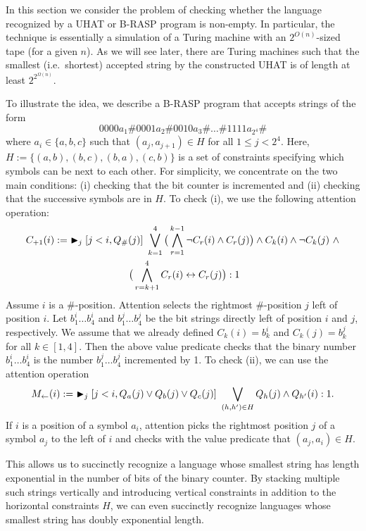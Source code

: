 In this section we consider the problem of checking whether the language
recognized by a UHAT or B-RASP program is non-empty. In particular, the
technique is essentially a simulation of a Turing machine with an
$2^{O(n)}$-sized tape (for a given $n$). As we will see later, 
there are Turing machines such that
the smallest (i.e.\ shortest) accepted string 
by the constructed UHAT
is of length at least $2^{2^{\Omega(n)}}$.

\begin{example}\label{ex:tiling}
To illustrate the idea, we describe a B-RASP program that accepts strings of the form
\[0000a_1 \# 0001a_2 \# 0010a_3 \# \dots \# 1111a_{2^4} \#\]
where $a_i \in \{a,b,c\}$ such that $(a_j,a_{j+1}) \in H$ for all $1 \le j < 2^4$.
Here, $H := \{(a,b),(b,c),(b,a),(c,b)\}$ is a set of constraints specifying which symbols can be next to each other.
For simplicity, we concentrate on the two main conditions: (i) checking that the bit counter is incremented and 
(ii) checking that the successive symbols are in $H$.
To check (i), we use the following attention operation:
\begin{multline*}
C_{+1}(i) :=\ \blacktriangleright_j[j<i,Q_\#(j)]\ \bigvee_{k=1}^4 \big(\bigwedge_{r=1}^{k-1} \neg C_r(i) \wedge C_r(j)\big) \wedge
C_k(i) \wedge \neg C_k(j)\ \wedge\\ \ \big(\bigwedge_{r=k+1}^{4} C_r(i) \leftrightarrow C_r(j)\big) : 1
\end{multline*}
Assume $i$ is a $\#$-position.
Attention selects the rightmost $\#$-position $j$ left of position $i$.
Let $b_1^i \dots b_4^i$ and $b_1^j \dots b_4^j$ be the bit strings directly left of position $i$ and $j$, respectively.
We assume that we already defined $C_k(i) = b_k^i$ and $C_k(j) = b_k^j$ for all $k \in [1,4]$.
Then the above value predicate checks that the binary number $b_1^i \dots b_4^i$ is the number $b_1^j \dots b_4^j$ incremented by 1.
To check (ii), we can use the attention operation
\begin{equation*}
M_{\leftarrow}(i) :=\ \maxatt_j[j<i,Q_a(j) \vee Q_b(j) \vee Q_c(j)]\ \bigvee_{(h,h') \in H} Q_h(j) \wedge Q_{h'}(i) : 1.
\end{equation*}
If $i$ is a position of a symbol $a_i$, attention picks the rightmost position $j$ of a symbol $a_j$ to the left of $i$ and 
checks with the value predicate that $(a_j,a_i) \in H$.

This allows us to succinctly recognize a language whose smallest string has length exponential 
in the number of bits of the binary counter.
By stacking multiple such strings vertically and 
introducing vertical constraints in addition to the horizontal constraints $H$,
we can even succinctly recognize languages whose smallest string has doubly exponential length. 
\end{example}

